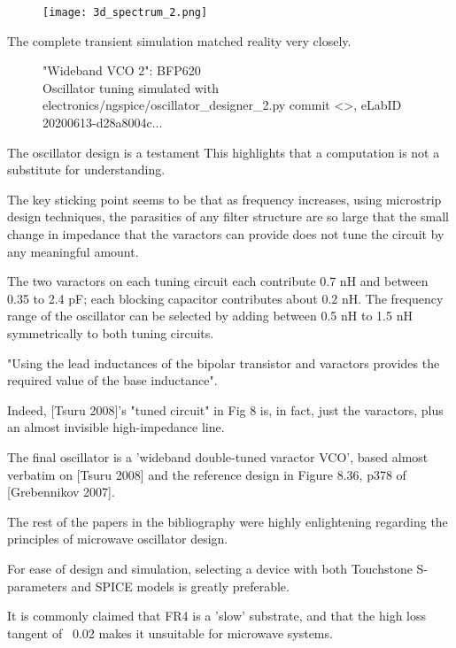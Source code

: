 \documentclass[paper.tex]{subfiles}
\begin{document}
\begin{figure}[H]
\texttt{[image: 3d\_spectrum\_2.png]}
\end{figure}

The complete transient simulation matched reality very closely. 

\begin{figure}[H]
	
 	\caption{"Wideband VCO 2": BFP620  \\
 	 Oscillator tuning simulated with electronics/ngspice/oscillator\_designer\_2.py commit <>, eLabID 20200613-d28a8004c...}
\end{figure}


The oscillator design is a testament  This highlights that a computation is not a substitute for understanding.

The key sticking point seems to be that as frequency increases, using microstrip design techniques, the parasitics of any filter structure are so large that the small change in impedance that the varactors can provide does not tune the circuit by any meaningful amount.

The two varactors on each tuning circuit each contribute 0.7 nH and between 0.35 to 2.4 pF; each blocking capacitor contributes about 0.2 nH. The frequency range of the oscillator can be selected by adding between 0.5 nH to 1.5 nH symmetrically to both tuning circuits. 

"Using the lead inductances of the bipolar transistor and varactors provides the required value of the base inductance".

Indeed, [Tsuru 2008]'s "tuned circuit" in Fig 8 is, in fact, just the varactors, plus an almost invisible high-impedance line.


The final oscillator is a 'wideband double-tuned varactor VCO', based almost verbatim on [Tsuru 2008] and the reference design in Figure 8.36, p378 of [Grebennikov 2007]. 



The rest of the papers in the bibliography were highly enlightening regarding the principles of microwave oscillator design.

For ease of design and simulation, selecting a device with both Touchstone S-parameters and SPICE models is greatly preferable.

It is commonly claimed that FR4 is a 'slow' substrate, and that the high loss tangent of ~0.02 makes it unsuitable for microwave systems.
\end{document}
